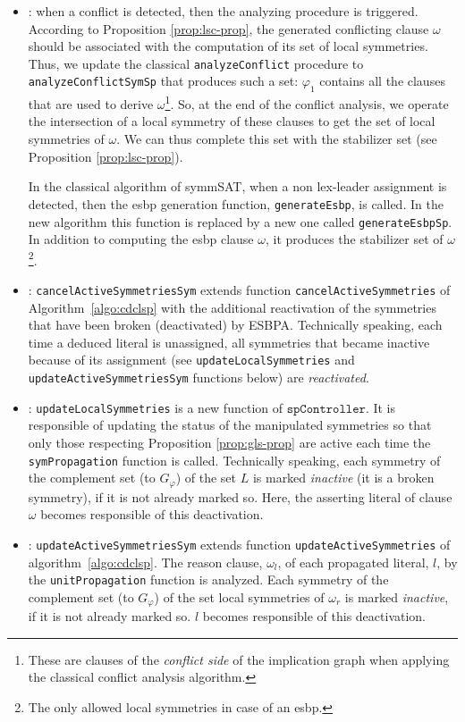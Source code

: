 \begin{itemize}[topsep=2pt]
 \item {}: when a conflict is detected, then the analyzing
 procedure is triggered. According to Proposition \ref{prop:lsc-prop}, the
 generated conflicting clause $\omega$ should be associated with the
 computation of its set of local symmetries. Thus, we update the classical
 \texttt{analyzeConflict} procedure to \texttt{analyzeConflictSymSp} that produces such
 a set: $\varphi_1$ contains all the clauses that are used to derive $\omega$\footnote{These are clauses of the \textit{conflict side} of the implication graph when applying the classical conflict analysis algorithm.}. So, at the end of the conflict analysis, we operate the intersection of a local symmetry of these clauses to get the set of local symmetries of $\omega$. We can thus complete this set with the stabilizer set (see Proposition \ref{prop:lsc-prop}).
 
 In the classical algorithm of symmSAT, when a non lex-leader assignment is detected, then the esbp generation function, \texttt{generateEsbp}, is
 called. In the new algorithm this function is replaced by a new one called
 \texttt{generateEsbpSp}. In addition to computing the esbp clause $\omega$, it
 produces the stabilizer set of $\omega$\footnote{The only allowed  local symmetries in case of an esbp.}.
 
 \item {}: \texttt{cancelActiveSymmetriesSym} extends function \texttt{cancelActiveSymmetries} of Algorithm~\ref{algo:cdclsp} with the additional reactivation of the symmetries that have been broken (deactivated) by ESBPA. Technically speaking, each time a deduced literal is unassigned, all symmetries that became inactive because of its assignment (see \texttt{updateLocalSymmetries} and \texttt{updateActiveSymmetriesSym} functions below) are \textit{reactivated}.
 
 \item {}: \texttt{updateLocalSymmetries} is a new function of
 $\texttt{spController}$. It is responsible of updating the status of the manipulated
 symmetries so that only those respecting Proposition \ref{prop:gls-prop} are
 active each time the \texttt{symPropagation} function is called. Technically speaking, each symmetry of the complement set (to $G_{\varphi}$) of the set $L$ is marked \textit{inactive} (it is a broken symmetry), if it is not already marked so. Here, the asserting literal of clause $\omega$ becomes responsible of this deactivation. 
 
 \item {}: \texttt{updateActiveSymmetriesSym} extends function \texttt{updateActiveSymmetries} of algorithm~\ref{algo:cdclsp}. The reason clause, $\omega_l$, of each propagated literal, $l$, by the \texttt{unitPropagation} function is analyzed. Each symmetry of the complement set (to $G_{\varphi}$) of the set local symmetries of $\omega_r$ is marked \textit{inactive}, if it is not already marked so. $l$ becomes responsible of this deactivation. 
\end{itemize}

